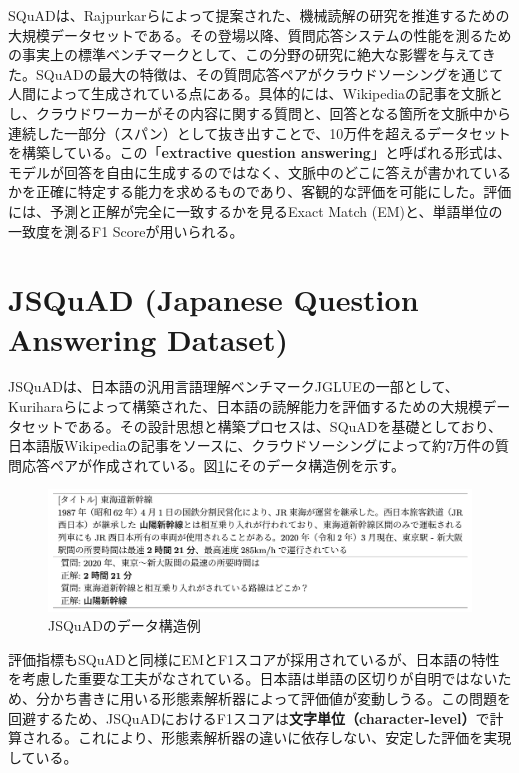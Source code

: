 \documentclass[a4paper,11pt]{jreport}
\begin{document}
SQuADは、Rajpurkarらによって提案された\cite{SQuAD}、機械読解の研究を推進するための大規模データセットである。その登場以降、質問応答システムの性能を測るための事実上の標準ベンチマークとして、この分野の研究に絶大な影響を与えてきた。SQuADの最大の特徴は、その質問応答ペアがクラウドソーシングを通じて人間によって生成されている点にある。具体的には、Wikipediaの記事を文脈とし、クラウドワーカーがその内容に関する質問と、回答となる箇所を文脈中から連続した一部分（スパン）として抜き出すことで、10万件を超えるデータセットを構築している。この「\textbf{extractive question answering}」と呼ばれる形式は、モデルが回答を自由に生成するのではなく、文脈中のどこに答えが書かれているかを正確に特定する能力を求めるものであり、客観的な評価を可能にした。評価には、予測と正解が完全に一致するかを見るExact Match (EM)と、単語単位の一致度を測るF1 Scoreが用いられる\cite{SQuAD}。

\section{JSQuAD (Japanese Question Answering Dataset)}

JSQuADは、日本語の汎用言語理解ベンチマークJGLUE\cite{JGLUE}の一部として、Kuriharaらによって構築された、日本語の読解能力を評価するための大規模データセットである。その設計思想と構築プロセスは、SQuAD\cite{SQuAD}を基礎としており、日本語版Wikipediaの記事をソースに、クラウドソーシングによって約7万件の質問応答ペアが作成されている。図\ref{fig:jsquad_example}にそのデータ構造例を示す。

\begin{figure}[t]
  \centering
  \includegraphics[width=0.9\linewidth]{./fig/jsquad.png}
  \caption{JSQuADのデータ構造例\cite{JGLUE}}
  \label{fig:jsquad_example}
\end{figure}

評価指標もSQuADと同様にEMとF1スコアが採用されているが、日本語の特性を考慮した重要な工夫がなされている。日本語は単語の区切りが自明ではないため、分かち書きに用いる形態素解析器によって評価値が変動しうる。この問題を回避するため、JSQuADにおけるF1スコアは\textbf{文字単位（character-level）}で計算される\cite{JGLUE}。これにより、形態素解析器の違いに依存しない、安定した評価を実現している。
\end{document}
